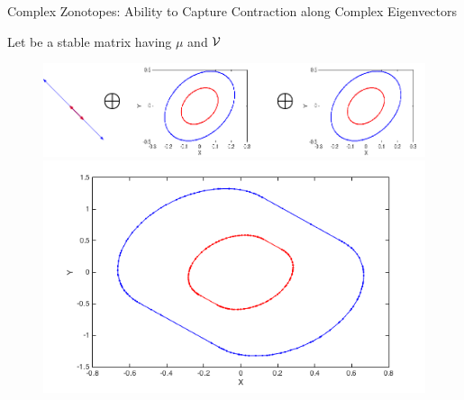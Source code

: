 
\begin{frame}{Complex Zonotopes: Ability to Capture Contraction along Complex Eigenvectors}

\begin{block}{}
{\small
Let  be a stable matrix having  $\mu$ and  $\mathcal{V}$
}
%
\end{block}
%
\begin{figure}
\center
\includegraphics[scale=0.25]{figures/CZtopes/eigcontraction.png}\\
\includegraphics[scale=0.25]{figures/CZtopes/contraction-zonotope.png}
\end{figure}
%
\end{frame}




